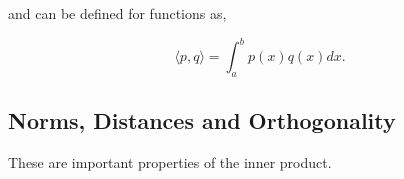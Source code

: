 \documentclass[12pt]{article}
\begin{document}
and can be defined for functions as,

\vspace{2mm}

$$ \langle p,q \rangle = \int_a^b p(x)q(x) dx. $$

\vspace{4mm}

\subsection{Norms, Distances and Orthogonality}

\vspace{4mm}

These are important properties of the inner product.

\vspace{6mm}
\end{document}
